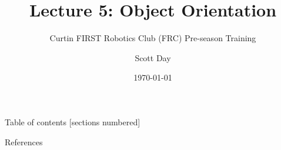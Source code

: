 \documentclass[9pt]{beamer}             %
\title{Lecture 5: Object Orientation}
\subtitle{Curtin FIRST Robotics Club (FRC) Pre-season Training}
\date{\today}
\author{Scott Day}
\institute{Curtin University}
\begin{document}


\maketitle


\begin{frame}{Table of contents}
  [sections numbered]
  \tableofcontents[hideallsubsections]
\end{frame}












\begin{frame}[allowframebreaks]{References}
  
  
\end{frame}

\end{document}
